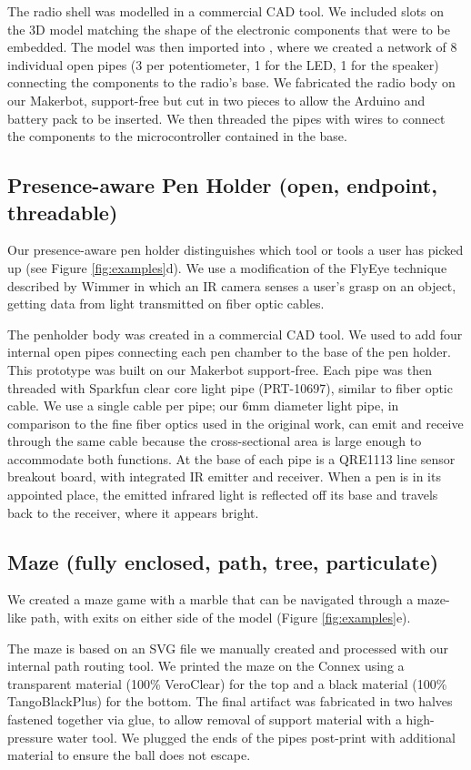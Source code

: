 The radio shell was modelled in a commercial CAD tool. We included slots on the 3D model matching the shape of the electronic components that were to be embedded. The model was then imported into \systemnamenospace, where we created a network of 8 individual open pipes (3 per potentiometer, 1 for the LED, 1 for the speaker) connecting the components to the radio's base. We fabricated the radio body on our Makerbot, support-free but cut in two pieces to allow the Arduino and battery pack to be inserted. We then threaded the pipes with wires to connect the components to the microcontroller contained in the base.

\subsection{Presence-aware Pen Holder (open, endpoint, threadable)}
Our presence-aware pen holder distinguishes which tool or tools a user has picked up (see Figure \ref{fig:examples}d).  We use a modification of the FlyEye technique described by Wimmer \cite{Wimmer-flyeye} in which an IR camera senses a user's grasp on an object, getting data from light transmitted on fiber optic cables.

The penholder body was created in a commercial CAD tool. We used \systemname to add four internal open pipes connecting each pen chamber to the base of the pen holder. This prototype was built on our Makerbot support-free.  Each pipe was then threaded with Sparkfun clear core light pipe (PRT-10697), similar to fiber optic cable.  We use a single cable per pipe; our 6mm diameter light pipe, in comparison to the fine fiber optics used in the original work, can emit and receive through the same cable because the cross-sectional area is large enough to accommodate both functions. At the base of each pipe is a QRE1113 line sensor breakout board, with integrated IR emitter and receiver.   When a pen is in its appointed place, the emitted infrared light is reflected off its base and travels back to the receiver, where it appears bright.

\subsection{Maze (fully enclosed, path, tree, particulate)}

We created a maze game with a marble that can be navigated through a maze-like path, with exits on either side of the model (Figure \ref{fig:examples}e). 

The maze is based on an SVG file we manually created and processed with our internal path routing tool.  We printed the maze on the Connex using a transparent material (100\% VeroClear) for the top and a black material (100\% TangoBlackPlus) for the bottom. The final artifact was fabricated in two halves fastened together via glue, to allow removal of support material with a high-pressure water tool.  We plugged the ends of the pipes post-print with additional material to ensure the ball does not escape.

